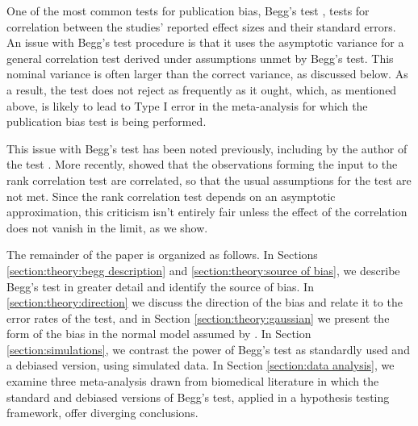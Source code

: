 \documentclass[12pt]{article}
\begin{document}
  One of the most common tests for publication bias, Begg's test
  \citep{begg1994a}, tests for correlation between the studies' reported
  effect sizes and their standard errors.  An issue with Begg's test
  procedure is that it uses the asymptotic variance for a general
  correlation test derived under assumptions unmet by Begg's
  test. This nominal variance is often larger than the correct
  variance, as discussed below. As a result, the test does not reject
  as frequently as it ought, which, as mentioned above, is likely to
  lead to Type I error in the meta-analysis for which the publication
  bias test is being performed.

    

    
    
    

  This issue with Begg's test has been noted previously, including by
  the author of the test \citep{begg1994a,begg1994b}. More recently,
  \citet{gjerdevik2014} showed that the observations forming the input
  to the rank correlation test are correlated, so that the usual
  assumptions for the test are not met. Since the
  rank correlation test depends on an asymptotic approximation, this
  criticism isn't entirely fair unless the effect of the correlation
  does not vanish in the limit, as we show.

  The remainder of the paper is organized as follows. In Sections
  \ref{section:theory:begg description} and \ref{section:theory:source
    of bias}, we describe Begg's test in greater detail and identify
  the source of bias. In \ref{section:theory:direction} we discuss the
  direction of the bias and relate it to the error rates of the test,
  and in Section \ref{section:theory:gaussian} we present the form of
  the bias in the normal model assumed by \citet{begg1994a}. In
  Section \ref{section:simulations}, we contrast the power of Begg's
  test as standardly used and a debiased version, using simulated
  data. In Section \ref{section:data analysis}, we examine three
  meta-analysis drawn from biomedical literature in which the standard
  and debiased versions of Begg's test, applied in a hypothesis
  testing framework, offer diverging conclusions.
  
\end{document}
